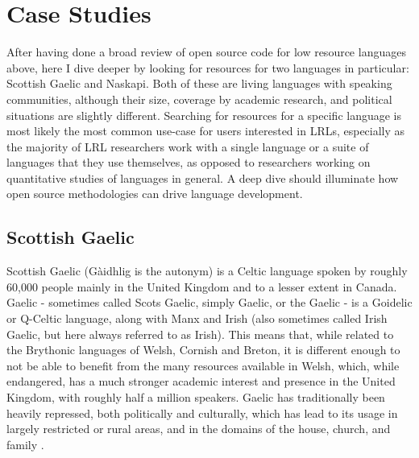 \section{Case Studies}
\label{sec:case-studies}

After having done a broad review of open source code for low resource languages above, here I dive deeper by looking for resources for two languages in particular: Scottish Gaelic and Naskapi. Both of these are living languages with speaking communities, although their size, coverage by academic research, and political situations are slightly different. Searching for resources for a specific language is most likely the most common use-case for users interested in LRLs, especially as the majority of LRL researchers work with a single language or a suite of languages that they use themselves, as opposed to researchers working on quantitative studies of languages in general. A deep dive should illuminate how open source methodologies can drive language development.

\subsection{Scottish Gaelic}
\label{sec:gaelic}

Scottish Gaelic (G\`aidhlig is the autonym) is a Celtic language spoken by roughly 60,000 people mainly in the United Kingdom and to a lesser extent in Canada. Gaelic - sometimes called Scots Gaelic, simply Gaelic, or the Gaelic - is a Goidelic or Q-Celtic language, along with Manx and Irish (also sometimes called Irish Gaelic, but here always referred to as Irish). This means that, while related to the Brythonic languages of Welsh, Cornish and Breton, it is different enough to not be able to benefit from the many resources available in Welsh, which, while endangered, has a much stronger academic interest and presence in the United Kingdom, with roughly half a million speakers. Gaelic has traditionally been heavily repressed, both politically and culturally, which has lead to its usage in largely restricted or rural areas, and in the domains of the house, church, and family \citep{mackinnon1991past}.

